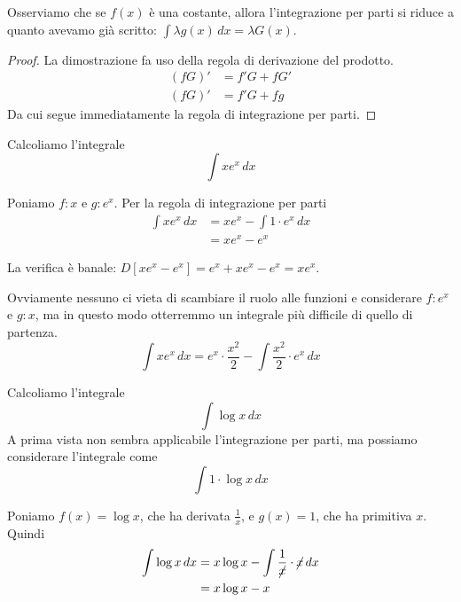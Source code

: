 Osserviamo che se $f(x)$ è una costante, allora l'integrazione per parti si riduce a quanto avevamo già scritto: $\int \lambda g(x) \, dx = \lambda G(x)$.

\begin{proof}
La dimostrazione fa uso della regola di derivazione del prodotto.
\begin{align*}
(fG)' &= f'G + fG' \\
(fG)' &= f'G + fg
\end{align*}
Da cui segue immediatamente la regola di integrazione per parti.
\end{proof}

\begin{example}
Calcoliamo l'integrale
\begin{equation*}
\int x e^x \, dx
\end{equation*}

Poniamo $f:x$ e $g: e^x$. Per la regola di integrazione per parti
\begin{align*}
\int x e^x \, dx &= xe^x - \int 1 \cdot e^x \, dx \\
&= xe^x - e^x
\end{align*}

La verifica è banale: $D[xe^x - e^x] = e^x + xe^x - e^x = xe^x$.

Ovviamente nessuno ci vieta di scambiare il ruolo alle funzioni e considerare $f: e^x$ e $g: x$, ma in questo modo otterremmo un integrale più
difficile di quello di partenza.
\begin{equation*}
\int x e^x \, dx = e^x \cdot \frac{x^2}{2} - \int \frac{x^2}{2} \cdot e^x \, dx 
\end{equation*}
\end{example}

\begin{example}
Calcoliamo l'integrale
\begin{equation*}
\int \log x \, dx
\end{equation*}
A prima vista non sembra applicabile l'integrazione per parti, ma possiamo considerare l'integrale come
\begin{equation*}
\int 1 \cdot \log x \, dx
\end{equation*}

Poniamo $f(x) = \log x$, che ha derivata $\frac{1}{x}$, e $g(x) = 1$, che ha primitiva $x$. Quindi
\begin{align*}
\int \log x \, dx &= x\log x - \int \frac{1}{\cancel{x}} \cdot \cancel{x} \, dx \\
&= x\log x - x
\end{align*}
\end{example}

